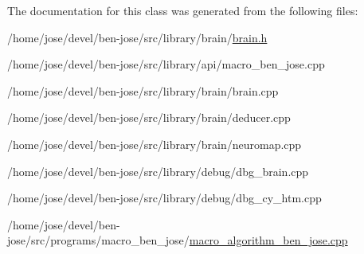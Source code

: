 The documentation for this class was generated from the following files\+:\begin{DoxyCompactItemize}
\item 
/home/jose/devel/ben-\/jose/src/library/brain/\hyperlink{brain_8h}{brain.\+h}\item 
/home/jose/devel/ben-\/jose/src/library/api/macro\+\_\+ben\+\_\+jose.\+cpp\item 
/home/jose/devel/ben-\/jose/src/library/brain/brain.\+cpp\item 
/home/jose/devel/ben-\/jose/src/library/brain/deducer.\+cpp\item 
/home/jose/devel/ben-\/jose/src/library/brain/neuromap.\+cpp\item 
/home/jose/devel/ben-\/jose/src/library/debug/dbg\+\_\+brain.\+cpp\item 
/home/jose/devel/ben-\/jose/src/library/debug/dbg\+\_\+cy\+\_\+htm.\+cpp\item 
/home/jose/devel/ben-\/jose/src/programs/macro\+\_\+ben\+\_\+jose/\hyperlink{macro__algorithm__ben__jose_8cpp}{macro\+\_\+algorithm\+\_\+ben\+\_\+jose.\+cpp}\end{DoxyCompactItemize}

